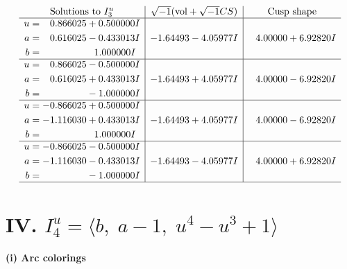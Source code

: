 \documentclass[1p]{elsarticle_modified}
\theoremstyle{definition}
\newcommand{\I}{\sqrt{-1}}
\begin{document}
$$\begin{array}{c|c|c}  
\text{Solutions to }I^u_{3}& \I (\text{vol} + \sqrt{-1}CS) & \text{Cusp shape}\\
 \hline 
\begin{aligned}
u &= \phantom{-}0.866025 + 0.500000 I \\
a &= \phantom{-}0.616025 - 0.433013 I \\
b &= \phantom{-0.000000 -}1.000000 I\end{aligned}
 & -1.64493 - 4.05977 I & \phantom{-}4.00000 + 6.92820 I \\ \hline\begin{aligned}
u &= \phantom{-}0.866025 - 0.500000 I \\
a &= \phantom{-}0.616025 + 0.433013 I \\
b &= \phantom{-0.000000 } -1.000000 I\end{aligned}
 & -1.64493 + 4.05977 I & \phantom{-}4.00000 - 6.92820 I \\ \hline\begin{aligned}
u &= -0.866025 + 0.500000 I \\
a &= -1.116030 + 0.433013 I \\
b &= \phantom{-0.000000 -}1.000000 I\end{aligned}
 & -1.64493 + 4.05977 I & \phantom{-}4.00000 - 6.92820 I \\ \hline\begin{aligned}
u &= -0.866025 - 0.500000 I \\
a &= -1.116030 - 0.433013 I \\
b &= \phantom{-0.000000 } -1.000000 I\end{aligned}
 & -1.64493 - 4.05977 I & \phantom{-}4.00000 + 6.92820 I\\
 \hline 
 \end{array}$$\newpage\newpage\renewcommand{\arraystretch}{1}
\centering \section*{IV. $I^u_{4}= \langle b,\;a-1,\;u^4- u^3+1 \rangle$}
\flushleft \textbf{(i) Arc colorings}\\
\end{document}

